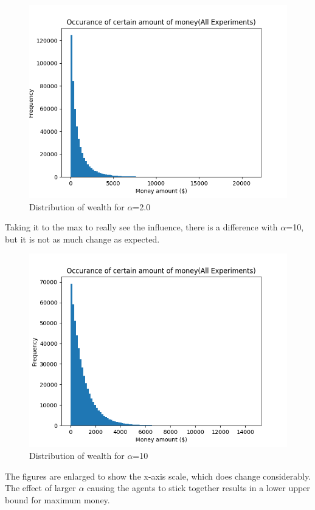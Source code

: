 \documentclass[12pt]{article} %
\begin{document}
\begin{figure} 
	\includegraphics[scale=\scaleResultsC]{a2.png} %
	\centering
	\caption{Distribution of wealth for $\alpha$=2.0}
	\label{fig:a2}
\end{figure}


Taking it to the max to really see the influence, there is a difference with
$\alpha$=10, but it is not as much change as expected.

\begin{figure}
	\includegraphics[scale=\scaleResultsC]{a10.png}
	\centering
	\caption{Distribution of wealth for $\alpha$=10}
	\label{fig:a10}
\end{figure}

The figures are enlarged to show the x-axis scale, which does change
considerably. The effect of larger $\alpha$ causing the agents to stick
together results in a lower upper bound for maximum money.
\end{document}
